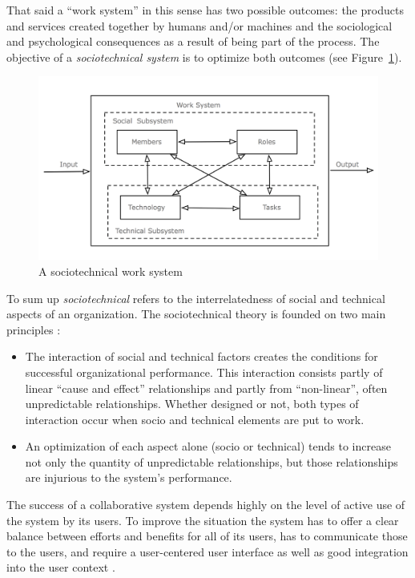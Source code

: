 That said a ``work system'' in this sense has two possible outcomes: the products and services created together by humans and/or machines and the sociological and psychological consequences as a result of being part of the process. The objective of a \emph{sociotechnical system} is to optimize both outcomes (see Figure~\ref{fig:images_sociotechnical_system}). \@

\begin{figure}[H]
  \centering
  \includegraphics[width=0.9\columnwidth]{images/sociotechnical_system.png}
  \caption[A sociotechnical work system]{A sociotechnical work system \citep{xx}}
  \label{fig:images_sociotechnical_system}
\end{figure}

To sum up \emph{sociotechnical} refers to the interrelatedness of social and technical aspects of an organization. The sociotechnical theory is founded on two main principles \citep{Koch2008}: \@

\begin{itemize}
  \item The interaction of social and technical factors creates the conditions for successful organizational performance. This interaction consists partly of linear ``cause and effect'' relationships and partly from ``non-linear'', often unpredictable relationships. Whether designed or not, both types of interaction occur when socio and technical elements are put to work.
  \item An optimization of each aspect alone (socio or technical) tends to increase not only the quantity of unpredictable relationships, but those relationships are injurious to the system's performance.
\end{itemize}

The success of a collaborative system depends highly on the level of active use of the system by its users. To improve the situation the system has to offer a clear balance between efforts and benefits for all of its users, has to communicate those to the users, and require a user-centered user interface as well as good integration into the user context \citep{Koch2008}.

